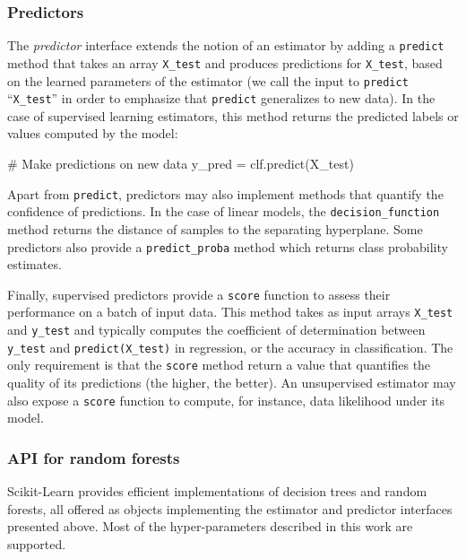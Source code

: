 \subsubsection{Predictors}

The \textit{predictor} interface extends the notion of an estimator by adding a
\texttt{predict} method that takes an array \texttt{X\_test} and produces
predictions for \texttt{X\_test}, based on the learned parameters of the
estimator (we call the input to \texttt{predict} ``\texttt{X\_test}'' in order
to emphasize that \texttt{predict} generalizes to new data). In the case of
supervised learning estimators, this method returns the predicted labels or
values computed by the model:

\vskip0.3cm
\begin{pythoncode}
# Make predictions on new data
y_pred = clf.predict(X_test)
\end{pythoncode}

Apart from \texttt{predict}, predictors may also implement methods that
quantify the confidence of predictions. In the case of linear models, the
\texttt{decision\_function} method returns the distance of samples to the
separating hyperplane. Some predictors also provide a \texttt{predict\_proba}
method which returns class probability estimates.

Finally, supervised predictors provide a \texttt{score} function to assess
their performance on a batch of input data. This method takes as input arrays
\texttt{X\_test} and \texttt{y\_test} and typically computes the coefficient of
determination between \texttt{y\_test} and \texttt{predict(X\_test)} in
regression, or the accuracy in classification. The only requirement is that the
\texttt{score} method return a value that quantifies the quality of its
predictions (the higher, the better). An unsupervised estimator may also expose
a \texttt{score} function to compute, for instance, data likelihood under its
model.

\subsubsection{API for random forests}

Scikit-Learn provides efficient implementations of decision trees and random
forests, all offered as objects implementing the estimator and predictor
interfaces presented above. Most of the hyper-parameters described
in this work are supported.

